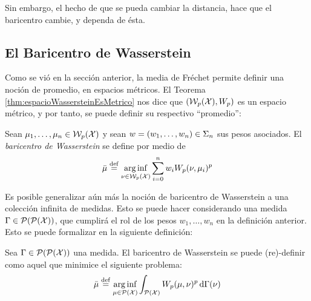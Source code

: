 {{{\begin{remark}
			  Sin embargo, el hecho de que se pueda cambiar la distancia, hace que el baricentro cambie, y dependa de ésta.
		  \end{remark}



	  }  %

	  \subsection*{El Baricentro de Wasserstein}\label{ssec:el-baricentro-de-Wasserstein}
	  {
		  Como se vió en la sección anterior, la media de Fréchet permite definir una noción de promedio, en espacios métricos. El Teorema \ref{thm:espacioWassersteinEsMetrico} nos dice que $(\WassersteinSpace[p]{\cX}, W_p)$ es un espacio métrico, y por tanto, se puede definir su respectivo ``promedio'':
		  \begin{definition}
			  Sean $\mu_1,\ldots, \mu_n \in \WassersteinSpace[p]{\cX} $ y sean $w = (w_1,\ldots, w_n) \in \Simplex[n]$ sus pesos asociados. El \emph{baricentro de Wasserstein} se define por medio de
			  \begin{equation}
				  \bar \mu \eqdef \arginf_{\nu \in \WassersteinSpace[p]{\cX} } \sum_{i=0}^{n} w_i \Wasserstein[p]{\nu}{\mu_i}^p
			  \end{equation}

		  \end{definition}

		  Es posible generalizar aún más la noción de baricentro de Wasserstein a una colección infinita de medidas. Esto se puede hacer considerando una medida $\Gamma \in \ProbSpace[\ProbSpace ] $, que cumplirá el rol de los pesos $w_1,\ldots, w_n $ en la definición anterior. Esto se puede formalizar en la siguiente definición:

		  \begin{definition}
			  Sea $\Gamma \in \ProbSpace[\ProbSpace]$ una medida. El baricentro de Wasserstein se puede (re)-definir como aquel que minimice el siguiente problema:
			  \begin{equation}
				  \bar \mu \eqdef \arginf_{\mu \in \ProbSpace} \int_{\ProbSpace} \Wasserstein[p]{\mu}{\nu}^p \dd{\Gamma(\nu)}
			  \end{equation}

		  \end{definition}


	  }  %


}}
